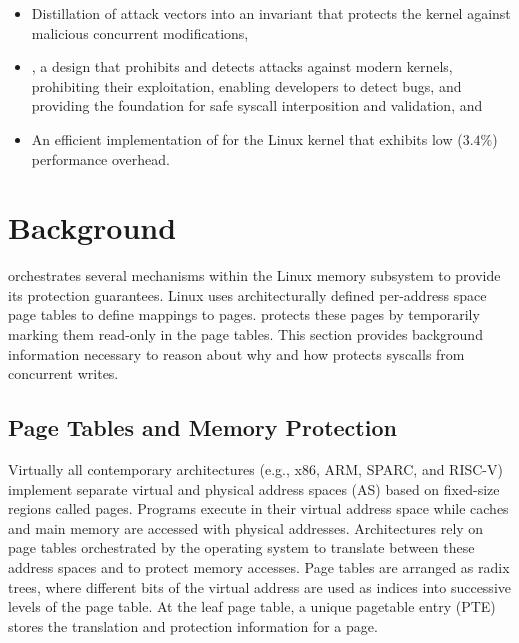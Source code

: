 \begin{itemize}
\item Distillation of \tocttou attack vectors into an invariant that protects
the kernel against malicious concurrent modifications,
\item \midas, a design that prohibits and detects
\tocttou attacks against modern kernels, prohibiting their exploitation,
enabling developers to detect \tocttou bugs, and providing the foundation for
safe syscall interposition and validation, and
\item An efficient implementation of \midas for the Linux kernel that exhibits
low ($3.4\%$) performance overhead.
\end{itemize}


\section{Background}

\midas orchestrates several mechanisms within the Linux memory subsystem
to provide its protection guarantees.
Linux uses architecturally defined per-address space page tables to define
mappings to pages.
\midas protects these pages by temporarily marking them read-only in the
page tables.
This section provides background information necessary to reason about
why and how \midas protects syscalls from concurrent writes.


\subsection{Page Tables and Memory Protection}

Virtually all contemporary architectures (e.g., x86, ARM, SPARC, and
RISC-V) implement separate virtual and physical
address spaces (AS) based on fixed-size regions called pages.
Programs execute in their virtual address space while caches and main memory
are accessed with physical addresses.
Architectures rely on page tables orchestrated by the operating system
to translate between these address spaces and to protect memory accesses.
Page tables are arranged as radix trees, where different bits of the
virtual address are used as indices into successive levels of the page table.
At the leaf page table, a unique pagetable entry (PTE) stores the
translation and protection information for a page.

